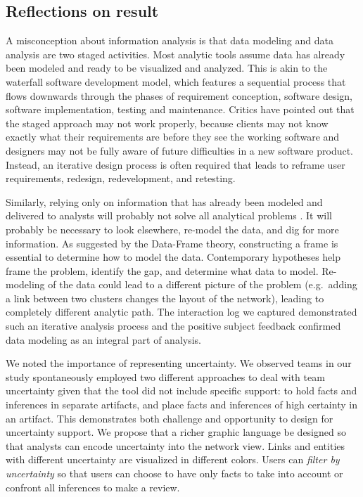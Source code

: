 \subsection{Reflections on result}\label{reflections-on-result}

A misconception about information analysis is that data modeling and
data analysis are two staged activities. Most analytic tools assume data
has already been modeled and ready to be visualized and analyzed. This
is akin to the waterfall software development model, which features a
sequential process that flows downwards through the phases of
requirement conception, software design, software implementation,
testing and maintenance. Critics have pointed out that the staged
approach may not work properly, because clients may not know exactly
what their requirements are before they see the working software and
designers may not be fully aware of future difficulties in a new
software product. Instead, an iterative design process is often required
that leads to reframe user requirements, redesign, redevelopment, and
retesting.

Similarly, relying only on information that has already been modeled and
delivered to analysts will probably not solve all analytical problems
\autocite{Heuer1999}. It will probably be necessary to look elsewhere,
re-model the data, and dig for more information. As suggested by the
Data-Frame theory, constructing a frame is essential to determine how to
model the data. Contemporary hypotheses help frame the problem, identify
the gap, and determine what data to model. Re-modeling of the data could
lead to a different picture of the problem (e.g.~adding a link between
two clusters changes the layout of the network), leading to completely
different analytic path. The interaction log we captured demonstrated
such an iterative analysis process and the positive subject feedback
confirmed data modeling as an integral part of analysis.

We noted the importance of representing uncertainty. We observed teams
in our study spontaneously employed two different approaches to deal
with team uncertainty given that the tool did not include specific
support: to hold facts and inferences in separate artifacts, and place
facts and inferences of high certainty in an artifact. This demonstrates
both challenge and opportunity to design for uncertainty support. We
propose that a richer graphic language be designed so that analysts can
encode uncertainty into the network view. Links and entities with
different uncertainty are visualized in different colors. Users can
\emph{filter by uncertainty} so that users can choose to have only facts
to take into account or confront all inferences to make a review.

